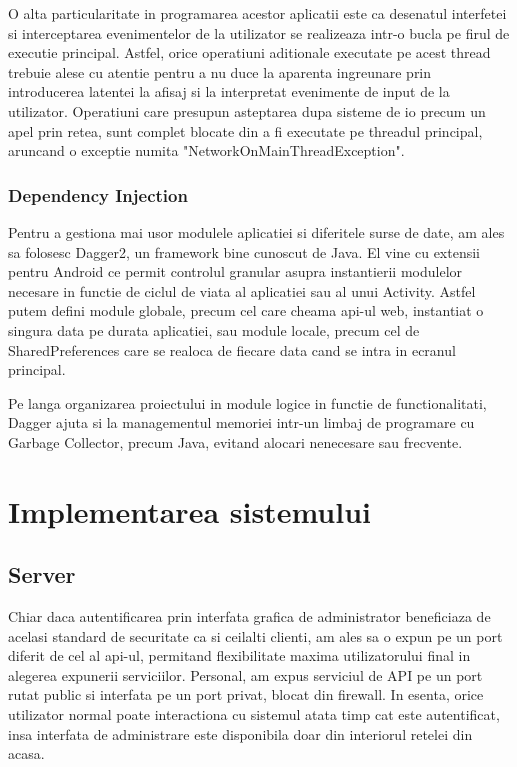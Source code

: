 O alta particularitate in programarea acestor aplicatii este ca desenatul interfetei si interceptarea evenimentelor de la utilizator se realizeaza intr-o bucla pe firul de executie principal. Astfel, orice operatiuni aditionale executate pe acest thread trebuie alese cu atentie pentru a nu duce la aparenta ingreunare prin introducerea latentei la afisaj si la interpretat evenimente de input de la utilizator. Operatiuni care presupun asteptarea dupa sisteme de \acrshort{io} precum un apel prin retea, sunt complet blocate din a fi executate pe threadul principal, aruncand o exceptie numita "NetworkOnMainThreadException".

\subsubsection {Dependency Injection}

Pentru a gestiona mai usor modulele aplicatiei si diferitele surse de date, am ales sa folosesc Dagger2, un framework bine cunoscut de Java. El vine cu extensii pentru Android ce permit controlul granular asupra instantierii modulelor necesare in functie de ciclul de viata al aplicatiei sau al unui Activity. Astfel putem defini module globale, precum cel care cheama api-ul web, instantiat o singura data pe durata aplicatiei, sau module locale, precum cel de SharedPreferences care se realoca de fiecare data cand se intra in ecranul principal.

Pe langa organizarea proiectului in module logice in functie de functionalitati, Dagger ajuta si la managementul memoriei intr-un limbaj de programare cu Garbage Collector, precum Java, evitand alocari nenecesare sau frecvente.


\section {Implementarea sistemului}

\subsection {Server}

Chiar daca autentificarea prin interfata grafica de administrator beneficiaza de acelasi standard de securitate ca si ceilalti clienti, am ales sa o expun pe un port diferit de cel al \acrshort{api}-ul, permitand flexibilitate maxima utilizatorului final in alegerea expunerii serviciilor. Personal, am expus serviciul de API pe un port rutat public si interfata pe un port privat, blocat din firewall. In esenta, orice utilizator normal poate interactiona cu sistemul atata timp cat este autentificat, insa interfata de administrare este disponibila doar din interiorul retelei din acasa.

